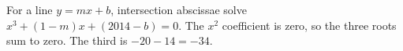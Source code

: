 For a line $y=mx+b$, intersection abscissae solve $x^3+(1-m)x+(2014-b)=0$. The $x^2$ coefficient is zero, so the three roots sum to zero. The third is $-20-14=\boxed{-34}$.
